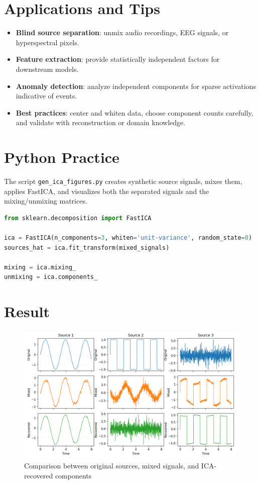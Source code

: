﻿\documentclass[12pt]{article}
\begin{document}
\section{Applications and Tips}
\begin{itemize}
  \item \textbf{Blind source separation}: unmix audio recordings, EEG signals, or hyperspectral pixels.
  \item \textbf{Feature extraction}: provide statistically independent factors for downstream models.
  \item \textbf{Anomaly detection}: analyze independent components for sparse activations indicative of events.
  \item \textbf{Best practices}: center and whiten data, choose component counts carefully, and validate with reconstruction or domain knowledge.
\end{itemize}

\section{Python Practice}
The script \texttt{gen\_ica\_figures.py} creates synthetic source signals, mixes them, applies FastICA, and visualizes both the separated signals and the mixing/unmixing matrices.
\begin{lstlisting}[language=Python,caption={Excerpt from gen_ica_figures.py}]
from sklearn.decomposition import FastICA

ica = FastICA(n_components=3, whiten='unit-variance', random_state=0)
sources_hat = ica.fit_transform(mixed_signals)

mixing = ica.mixing_
unmixing = ica.components_
\end{lstlisting}

\section{Result}
\begin{figure}[H]
  \centering
  \includegraphics[width=0.85\linewidth]{ica_sources_vs_recovered.png}
  \caption{Comparison between original sources, mixed signals, and ICA-recovered components}
  \label{fig:ica_sources_vs_recovered}
\end{figure}
\end{document}
